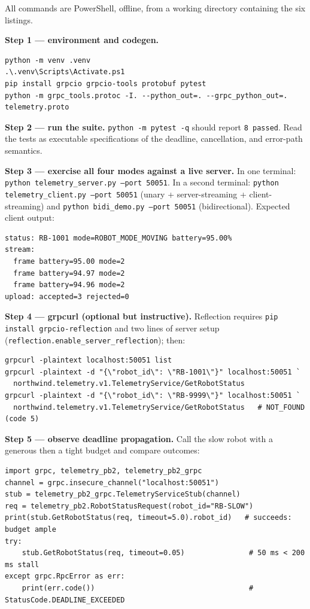 All commands are PowerShell, offline, from a working directory containing the
six listings.

\textbf{Step 1 --- environment and codegen.}

\begin{verbatim}
python -m venv .venv
.\.venv\Scripts\Activate.ps1
pip install grpcio grpcio-tools protobuf pytest
python -m grpc_tools.protoc -I. --python_out=. --grpc_python_out=. telemetry.proto
\end{verbatim}

\textbf{Step 2 --- run the suite.} \texttt{python -m pytest -q} should report
\texttt{8 passed}. Read the tests as executable specifications of the deadline,
cancellation, and error-path semantics.

\textbf{Step 3 --- exercise all four modes against a live server.} In one
terminal: \texttt{python telemetry\_server.py --port 50051}. In a second
terminal: \texttt{python telemetry\_client.py --port 50051} (unary +
server-streaming + client-streaming) and \texttt{python bidi\_demo.py --port
50051} (bidirectional). Expected client output:

\begin{verbatim}
status: RB-1001 mode=ROBOT_MODE_MOVING battery=95.00%
stream:
  frame battery=95.00 mode=2
  frame battery=94.97 mode=2
  frame battery=94.96 mode=2
upload: accepted=3 rejected=0
\end{verbatim}

\textbf{Step 4 --- grpcurl (optional but instructive).} Reflection requires
\texttt{pip install grpcio-reflection} and two lines of server setup
(\texttt{reflection.enable\_server\_reflection}); then:

\begin{verbatim}
grpcurl -plaintext localhost:50051 list
grpcurl -plaintext -d "{\"robot_id\": \"RB-1001\"}" localhost:50051 `
  northwind.telemetry.v1.TelemetryService/GetRobotStatus
grpcurl -plaintext -d "{\"robot_id\": \"RB-9999\"}" localhost:50051 `
  northwind.telemetry.v1.TelemetryService/GetRobotStatus   # NOT_FOUND (code 5)
\end{verbatim}

\textbf{Step 5 --- observe deadline propagation.} Call the slow robot with a
generous then a tight budget and compare outcomes:

\begin{verbatim}
import grpc, telemetry_pb2, telemetry_pb2_grpc
channel = grpc.insecure_channel("localhost:50051")
stub = telemetry_pb2_grpc.TelemetryServiceStub(channel)
req = telemetry_pb2.RobotStatusRequest(robot_id="RB-SLOW")
print(stub.GetRobotStatus(req, timeout=5.0).robot_id)   # succeeds: budget ample
try:
    stub.GetRobotStatus(req, timeout=0.05)               # 50 ms < 200 ms stall
except grpc.RpcError as err:
    print(err.code())                                    # StatusCode.DEADLINE_EXCEEDED
\end{verbatim}

